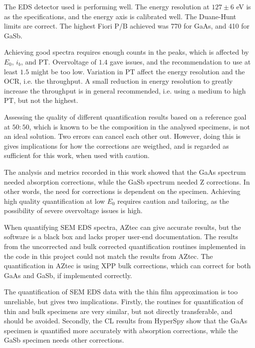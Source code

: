 The EDS detector used is performing well.
The energy resolution at $127 \pm6$ eV is as the specifications, and the energy axis is calibrated well.
The Duane-Hunt limits are correct.
The highest Fiori P/B achieved was 770 for GaAs, and 410 for GaSb.

Achieving good spectra requires enough counts in the peaks, which is affected by $E_0$, $i_b$, and PT.
Overvoltage of $1.4$ gave issues, and the recommendation to use at least $1.5$ might be too low.
Variation in PT affect the energy resolution and the OCR, i.e. the throughput.
A small reduction in energy resolution to greatly increase the throughput is in general recommended, i.e. using a medium to high PT, but not the highest.





Assessing the quality of different quantification results based on a reference goal at $50:50$, which is known to be the composition in the analysed specimens, is not an ideal solution.
Two errors can cancel each other out.
However, doing this is gives implications for how the corrections are weigthed, and is regarded as sufficient for this work, when used with caution.

The analysis and metrics recorded in this work showed that the GaAs spectrum needed absorption corrections, while the GaSb spectrum needed Z corrections.
In other words, the need for corrections is dependent on the specimen.
Achieving high quality quantification at low $E_0$ requires caution and tailoring, as the possibility of severe overvoltage issues is high.

When quantifying SEM EDS spectra, AZtec can give accurate results, but the software is a black box and lacks proper user-end documentation.
The results from the uncorrected and bulk corrected quantification routines implemented in the code in this project could not match the results from AZtec.
The quantification in AZtec is using XPP bulk corrections, which can correct for both GaAs and GaSb, if implemented correctly.

The quantification of SEM EDS data with the thin film approximation is too unreliable, but gives two implications.
Firstly, the routines for quantification of thin and bulk specimens are very similar, but not directly transferable, and should be avoided.
Secondly, the CL results from HyperSpy show that the GaAs specimen is quantified more accurately with absorption corrections, while the GaSb specimen needs other corrections.

